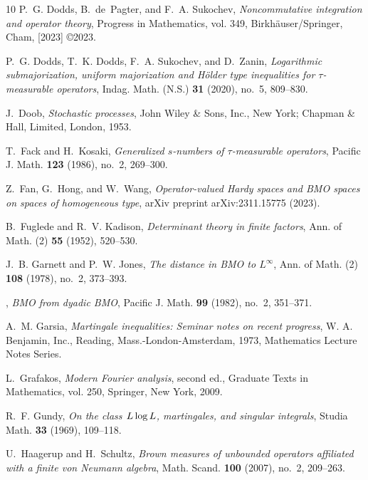 \documentclass[11]{amsart}
\numberwithin{equation}{section}
\begin{document}
\begin{thebibliography}{10}
	P.~G. Dodds, B.~de~Pagter, and F.~A. Sukochev, \emph{Noncommutative integration
		and operator theory}, Progress in Mathematics, vol. 349,
	Birkh\"{a}user/Springer, Cham, [2023] \copyright 2023. 
	
	P.~G. Dodds, T.~K. Dodds, F.~A. Sukochev, and D.~Zanin, \emph{Logarithmic
		submajorization, uniform majorization and {H}\"{o}lder type inequalities for
		{$\tau$}-measurable operators}, Indag. Math. (N.S.) \textbf{31} (2020),
	no.~5, 809--830. 
	
	J.~Doob, \emph{Stochastic processes}, John Wiley \& Sons, Inc., New York;
	Chapman \& Hall, Limited, London, 1953. 
	
	T.~Fack and H.~Kosaki, \emph{Generalized {$s$}-numbers of {$\tau$}-measurable
		operators}, Pacific J. Math. \textbf{123} (1986), no.~2, 269--300. 
	
	Z.~Fan, G.~Hong, and W.~Wang, \emph{{O}perator-valued {H}ardy spaces and {BMO}
		spaces on spaces of homogeneous type}, arXiv preprint arXiv:2311.15775
	(2023).
	
	B.~Fuglede and R.~V. Kadison, \emph{Determinant theory in finite factors}, Ann.
	of Math. (2) \textbf{55} (1952), 520--530. 
	
	J.~B. Garnett and P.~W. Jones, \emph{The distance in {BMO} to {$L^{\infty }$}},
	Ann. of Math. (2) \textbf{108} (1978), no.~2, 373--393. 
	
	\bysame, \emph{B{MO} from dyadic {BMO}}, Pacific J. Math. \textbf{99} (1982),
	no.~2, 351--371. 
	
	A.~M. Garsia, \emph{Martingale inequalities: {S}eminar notes on recent
		progress}, W. A. Benjamin, Inc., Reading, Mass.-London-Amsterdam, 1973,
	Mathematics Lecture Notes Series. 
	
	L.~Grafakos, \emph{Modern {F}ourier analysis}, second ed., Graduate Texts in
	Mathematics, vol. 250, Springer, New York, 2009. 
	
	R.~F. Gundy, \emph{On the class {$L\,{\rm log}\,L$}, martingales, and singular
		integrals}, Studia Math. \textbf{33} (1969), 109--118. 
	
	U.~Haagerup and H.~Schultz, \emph{Brown measures of unbounded operators
		affiliated with a finite von {N}eumann algebra}, Math. Scand. \textbf{100}
	(2007), no.~2, 209--263. 
	

\end{thebibliography}
\end{document}
